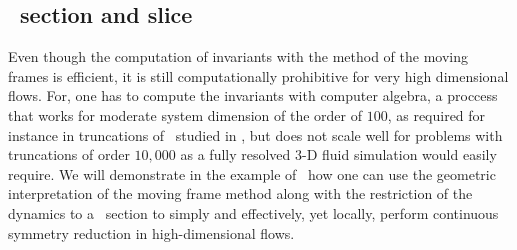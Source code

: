 \subsection{\label{s:laserMFnum}\Poincare\ section and slice}

Even though the computation of invariants with the method of
the moving frames is efficient, it is still computationally
prohibitive for very high dimensional flows. For, one has
to compute the invariants with computer algebra, a proccess 
that works for moderate system dimension of the order of $100$,
as required for instance in truncations of \KSe\ studied in ,
but does not scale well for problems with truncations of order $10,000$ as
a fully resolved $3$-D fluid simulation would easily require.
We will demonstrate in the example of \CLe\ 
how one can use the geometric interpretation of the moving frame method along
with the restriction of the dynamics to a \Poincare\ section
to simply and effectively, yet locally, perform continuous symmetry
reduction in high-dimensional flows.

